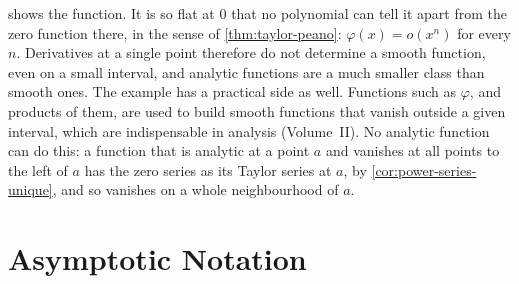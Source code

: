  shows the function. It is so flat at $0$ that no polynomial can tell it apart from the zero function there, in the sense of \cref{thm:taylor-peano}: $\varphi(x)=o(x^n)$ for every $n$. Derivatives at a single point therefore do not determine a smooth function, even on a small interval, and analytic functions are a much smaller class than smooth ones. The example has a practical side as well. Functions such as $\varphi$, and products of them, are used to build smooth functions that vanish outside a given interval, which are indispensable in analysis (Volume~II). No analytic function can do this: a function that is analytic at a point $a$ and vanishes at all points to the left of $a$ has the zero series as its Taylor series at $a$, by \cref{cor:power-series-unique}, and so vanishes on a whole neighbourhood of $a$.

\begin{table}
\end{table}

\section{Asymptotic Notation}
\label{sec:asymptotic-notation}

